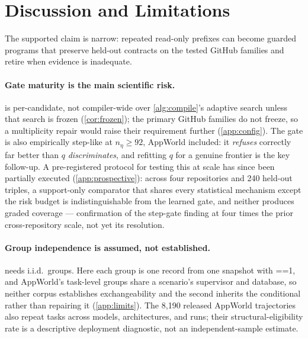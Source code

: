 \section{Discussion and Limitations}
\label{sec:discussion}

The supported claim is narrow: repeated read-only prefixes can become guarded
programs that preserve held-out contracts on the tested GitHub families and
retire when evidence is inadequate.

\paragraph{Gate maturity is the main scientific risk.}
 is per-candidate, not compiler-wide over
\cref{alg:compile}'s adaptive search unless that search is frozen
(\cref{cor:frozen}); the primary GitHub families do not freeze, so a
multiplicity repair would raise their requirement further (\cref{app:config}).
The gate is also empirically step-like at $n_\eta\ge 92$, AppWorld included: it
\emph{refuses} correctly far better than $q$ \emph{discriminates}, and
refitting $q$ for a genuine frontier is the key follow-up.  A pre-registered
protocol for testing this at scale has since been partially executed
(\cref{app:prospective}): across four repositories and 240 held-out triples,
a support-only comparator that shares every statistical mechanism except the
risk budget is indistinguishable from the learned gate, and neither produces
graded coverage --- confirmation of the step-gate finding at four times the
prior cross-repository scale, not yet its resolution.

\paragraph{Group independence is assumed, not established.}
 needs i.i.d.\ groups. Here each group is one record from
one snapshot with ==1, and AppWorld's
task-level groups share a scenario's supervisor and database, so neither corpus
establishes exchangeability and the second inherits the conditional rather than
repairing it (\cref{app:limits}). The 8{,}190 released AppWorld trajectories also
repeat tasks across models, architectures, and runs; their structural-eligibility
rate is a descriptive deployment diagnostic, not an independent-sample estimate.

